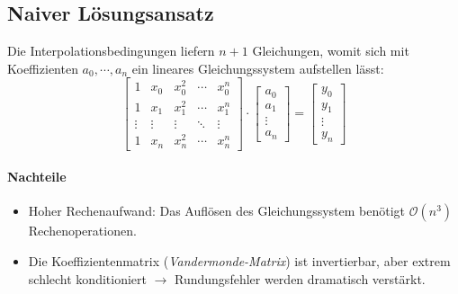 \documentclass[a4paper, 11pt, accentcolor = tud3b]{tudreport}
\begin{document}
	        \subsection{Naiver Lösungsansatz}
	            Die Interpolationsbedingungen liefern \( n + 1 \) Gleichungen, womit sich mit Koeffizienten \( a_0, \cdots, a_n \) ein lineares Gleichungssystem aufstellen lässt:
	            \begin{equation*}
		            \begin{bmatrix}
		            	1      & x_0    & x_0^2  & \cdots & x_0^n  \\
		            	1      & x_1    & x_1^2  & \cdots & x_1^n  \\
		            	\vdots & \vdots & \vdots & \ddots & \vdots \\
		            	1      & x_n    & x_n^2  & \cdots & x_n^n
		            \end{bmatrix}
		            \cdot
		            \begin{bmatrix}
			            a_0 \\
			            a_1 \\
			            \vdots \\
			            a_n
		            \end{bmatrix}
		            =
		            \begin{bmatrix}
			            y_0 \\
			            y_1 \\
			            \vdots \\
			            y_n
		            \end{bmatrix}
	            \end{equation*}
	            
	            \paragraph{Nachteile}
		            \begin{itemize}
		            	\item Hoher Rechenaufwand: Das Auflösen des Gleichungssystem benötigt \( \mathcal{O}(n^3) \) Rechenoperationen.
		            	\item Die Koeffizientenmatrix (\textit{Vandermonde-Matrix}) ist invertierbar, aber extrem schlecht konditioniert \(\rightarrow\) Rundungsfehler werden dramatisch verstärkt.
		            \end{itemize}
	
\end{document}
